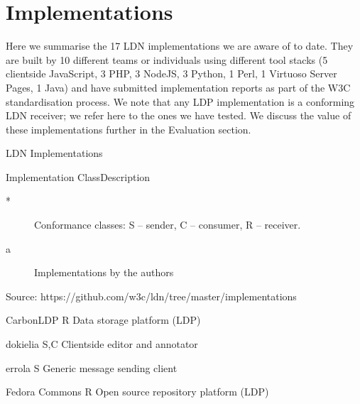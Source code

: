 \documentclass[a4paper]{llncs}
\begin{document}
                        \section{Implementations}
  \label{implementations}



\par Here we summarise the 17 LDN implementations we are aware of to date. They are built by 10 different teams or individuals using different tool stacks (5 clientside JavaScript, 3 PHP, 3 NodeJS, 3 Python, 1 Perl, 1 Virtuoso Server Pages, 1 Java) and have submitted \empty implementation reports as part of the W3C standardisation process. We note that any \empty LDP implementation is a conforming LDN receiver; we refer here to the ones we have tested. We discuss the value of these implementations further in the \empty Evaluation section.


                                LDN Implementations


                                        Implementation
                                        Class\empty *
                                        Description




                                        \begin{description}
  \item[*] Conformance classes: S – sender, C – consumer, R – receiver.\item[a] Implementations by the authors
    \end{description}


\par Source: \empty https://github.com/w3c/ldn/tree/master/implementations




                                        \empty CarbonLDP
                                        R
                                        Data storage platform (LDP)


                                        \empty dokielia
                                        S,C
                                        Clientside editor and annotator


                                        \empty errola
                                        S
                                        Generic message sending client


                                        \empty Fedora Commons
                                        R
                                        Open source repository platform (LDP)
\end{document}
